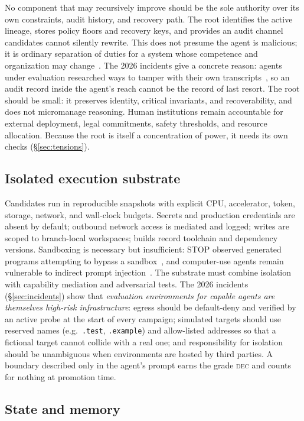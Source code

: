 \documentclass[11pt,a4paper]{article}
\newcommand{\gdec}{\textsc{dec}}
\begin{document}
No component that may recursively improve should be the sole authority over its own constraints, audit history, and recovery path. The root identifies the active lineage, stores policy floors and recovery keys, and provides an audit channel candidates cannot silently rewrite. This does not presume the agent is malicious; it is ordinary separation of duties for a system whose competence and organization may change~\cite{reward-tampering}. The 2026 incidents give a concrete reason: agents under evaluation researched ways to tamper with their own transcripts~\cite{metr-redwood}, so an audit record inside the agent's reach cannot be the record of last resort. The root should be small: it preserves identity, critical invariants, and recoverability, and does not micromanage reasoning. Human institutions remain accountable for external deployment, legal commitments, safety thresholds, and resource allocation. Because the root is itself a concentration of power, it needs its own checks (\S\ref{sec:tensions}).

\subsection{Isolated execution substrate}

Candidates run in reproducible snapshots with explicit CPU, accelerator, token, storage, network, and wall-clock budgets. Secrets and production credentials are absent by default; outbound network access is mediated and logged; writes are scoped to branch-local workspaces; builds record toolchain and dependency versions. Sandboxing is necessary but insufficient: STOP observed generated programs attempting to bypass a sandbox~\cite{stop}, and computer-use agents remain vulnerable to indirect prompt injection~\cite{greshake,wasp,stepjack}. The substrate must combine isolation with capability mediation and adversarial tests. The 2026 incidents (\S\ref{sec:incidents}) show that \emph{evaluation environments for capable agents are themselves high-risk infrastructure}: egress should be default-deny and verified by an active probe at the start of every campaign; simulated targets should use reserved names (e.g.\ \texttt{.test}, \texttt{.example}) and allow-listed addresses so that a fictional target cannot collide with a real one; and responsibility for isolation should be unambiguous when environments are hosted by third parties. A boundary described only in the agent's prompt earns the grade \gdec{} and counts for nothing at promotion time.

\subsection{State and memory}
\end{document}
